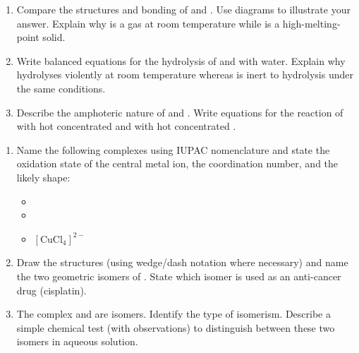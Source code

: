 \documentclass[11pt]{article}
\newcounter{popsec}
\newcounter{popsub}
\newcommand{\courssub}[1]{%
  \stepcounter{popsub}%
  \par\vspace{9pt}\noindent{\popxbold\fontsize{11.5}{13}\selectfont\color{popink}{\color{poporange}\thepopsec.\thepopsub}\hspace{6pt}#1}\par\nopagebreak\vspace{4pt}
}
\begin{document}
\begin{exercice}
\begin{enumerate}
\item Compare the structures and bonding of  and . Use diagrams to illustrate your answer. Explain why  is a gas at room temperature while  is a high-melting-point solid.
\item Write balanced equations for the hydrolysis of  and  with water. Explain why  hydrolyses violently at room temperature whereas  is inert to hydrolysis under the same conditions.
\item Describe the amphoteric nature of  and . Write equations for the reaction of  with hot concentrated  and with hot concentrated .
\end{enumerate}
\end{exercice}

\begin{exercice}
\begin{enumerate}
\item Name the following complexes using IUPAC nomenclature and state the oxidation state of the central metal ion, the coordination number, and the likely shape:
      \begin{itemize}
      \item {}
      \item {}
      \item \ensuremath{\mathrm{[CuCl_{4}]^{2-}}}
      \end{itemize}
\item Draw the structures (using wedge/dash notation where necessary) and name the two geometric isomers of \ce{[Pt(NH3)2Cl2]}. State which isomer is used as an anti-cancer drug (cisplatin).
\item The complex  and  are isomers. Identify the type of isomerism. Describe a simple chemical test (with observations) to distinguish between these two isomers in aqueous solution.
\end{enumerate}
\end{exercice}

\courssub{I prepare for the GCE}
\end{document}
